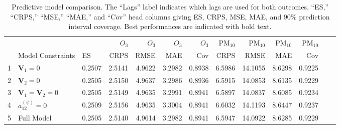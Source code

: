 \documentclass[alpha-refs]{wiley-article}
\newcommand{\bV}{\textbf{V}}
\begin{document}
\vspace{-3mm}
\begin{table}[H]
\centering
\scriptsize
\begin{tabular}{lllrrrrrrrrrr}
 & &  &  &  &  &  &  &  & & \\
 \hline
 & &   & $O_3$ & $O_3$  & $O_3$ & $O_3$ & $\text{PM}_{10}$ & $\text{PM}_{10}$  & $\text{PM}_{10}$ & $\text{PM}_{10}$ \\
  & Model Constraints & ES & CRPS & RMSE  & MAE & Cov & CRPS & RMSE  & MAE & Cov \\
  \hline
1 & $\bV_1 = 0$  & 0.2507 & 2.5141 & 4.9622 & 3.2982 & 0.8938 & 6.5986 & 14.1055 & 8.6298 & 0.9225  \\
2 & $\bV_2 = 0$   & 0.2505 & 2.5150 & 4.9637 & 3.2986 & 0.8936 & 6.5915 & 14.0853 & 8.6135 & 0.9229  \\
3 & $\bV_1 = \bV_2 = 0$  & 0.2505 & 2.5149 & 4.9635 & 3.2991 & 0.8941 & 6.5897 & 14.0837 & 8.6085 & 0.9234  \\
4 & $a_{12}^{(\psi)} = 0$ & 0.2509 & 2.5156 & 4.9635 & 3.3004 & 0.8941 & 6.6032 & 14.1193 & 8.6447 & 0.9237  \\
5  & Full Model & 0.2505 & 2.5140 & 4.9614 & 3.2982 & 0.8941 & 6.5947 & 14.0922 & 8.6285 &  0.9229 \\
   \hline
\end{tabular}
\caption{Predictive model comparison. The ``Lags'' label indicates which lags are used for both outcomes. ``ES,'' ``CRPS,'' ``MSE,'' ``MAE,'' and ``Cov'' head columns giving ES, CRPS, MSE, MAE, and 90\% prediction interval coverage. Best performances are indicated with bold text.
}\label{tab:mod_comp2}
\end{table}
\end{document}
